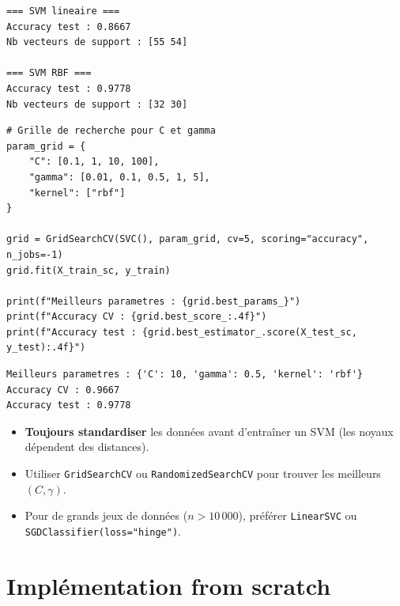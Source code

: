 \begin{codeoutput}
\begin{verbatim}
=== SVM lineaire ===
Accuracy test : 0.8667
Nb vecteurs de support : [55 54]

=== SVM RBF ===
Accuracy test : 0.9778
Nb vecteurs de support : [32 30]
\end{verbatim}
\end{codeoutput}

\begin{codeblock}[title=\textbf{Recherche d'hyperparam\`etres par validation crois\'ee}]
\begin{verbatim}
# Grille de recherche pour C et gamma
param_grid = {
    "C": [0.1, 1, 10, 100],
    "gamma": [0.01, 0.1, 0.5, 1, 5],
    "kernel": ["rbf"]
}

grid = GridSearchCV(SVC(), param_grid, cv=5, scoring="accuracy", n_jobs=-1)
grid.fit(X_train_sc, y_train)

print(f"Meilleurs parametres : {grid.best_params_}")
print(f"Accuracy CV : {grid.best_score_:.4f}")
print(f"Accuracy test : {grid.best_estimator_.score(X_test_sc, y_test):.4f}")
\end{verbatim}
\end{codeblock}

\begin{codeoutput}
\begin{verbatim}
Meilleurs parametres : {'C': 10, 'gamma': 0.5, 'kernel': 'rbf'}
Accuracy CV : 0.9667
Accuracy test : 0.9778
\end{verbatim}
\end{codeoutput}

\begin{bonnepratique}[title=\textbf{Conseils pour l'utilisation des SVM}]
\begin{itemize}
  \item \textbf{Toujours standardiser} les donn\'ees avant d'entra\^iner un SVM
    (les noyaux d\'ependent des distances).
  \item Utiliser \texttt{GridSearchCV} ou \texttt{RandomizedSearchCV} pour
    trouver les meilleurs $(C, \gamma)$.
  \item Pour de grands jeux de donn\'ees ($n > 10\,000$), pr\'ef\'erer
    \texttt{LinearSVC} ou \texttt{SGDClassifier(loss="hinge")}.
\end{itemize}
\end{bonnepratique}

\section{Impl\'ementation from scratch}
\label{sec:svm-scratch}

